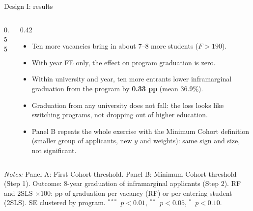 \documentclass{beamer}
\newcommand{\sym}[1]{\ensuremath{^{#1}}}
\begin{document}
\begin{frame}{Design I: results}
\begin{columns}[T,onlytextwidth]
\begin{column}{0.55\textwidth}
\centering
\tiny
\resizebox{\linewidth}{!}{}
\end{column}
\begin{column}{0.42\textwidth}
\scriptsize
\begin{itemize}
    \setlength{\itemsep}{3pt}
    \item Ten more vacancies bring in about 7--8 more students ($F>190$).
    \item With year FE only, the effect on program graduation is zero.
    \item Within university and year, ten more entrants lower inframarginal graduation from the program by
    \textbf{0.33 pp} (mean 36.9\%).
    \item Graduation from any university does not fall: the loss looks like switching programs, not dropping out of higher education.
    \item Panel B repeats the whole exercise with the Minimum Cohort definition (smaller group of applicants, new $y$ and weights): same sign and size, not significant.
\end{itemize}
\end{column}
\end{columns}

\vspace{0.08cm}
\parbox{0.97\textwidth}{\tiny \textit{Notes:} Panel A: First Cohort threshold. Panel B: Minimum Cohort threshold (Step 1). Outcome: 8-year graduation of inframarginal applicants (Step 2). RF and 2SLS $\times 100$: pp of graduation per vacancy (RF) or per entering student (2SLS).
SE clustered by program. \sym{***}~$p<0.01$, \sym{**}~$p<0.05$, \sym{*}~$p<0.10$.}
\end{frame}
\end{document}
